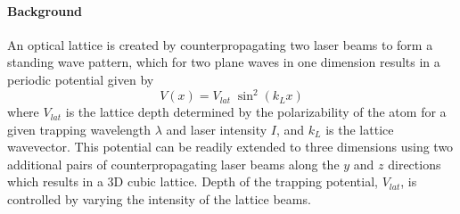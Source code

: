 \paragraph{Background} \label{sec:latBackground}
An optical lattice is created by counterpropagating two laser beams to form a standing wave pattern, which for two plane waves in one dimension results in a periodic potential given by 
	\begin{equation}
		 V(x) = V_{lat} \; \sin^2(k_L x)
	\end{equation}
where $V_{lat}$ is the lattice depth determined by the polarizability of the atom for a given trapping wavelength $\lambda$ and laser intensity $I$, and $k_L$ is the lattice wavevector.
This potential can be readily extended to three dimensions using two additional pairs of counterpropagating laser beams along the $y$ and $z$ directions which results in a 3D cubic lattice.
Depth of the trapping potential, $V_{lat}$, is controlled by varying the intensity of the lattice beams.

